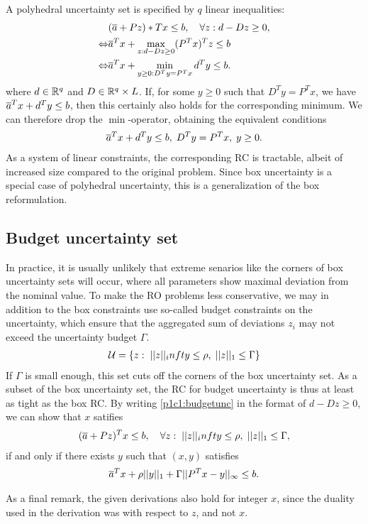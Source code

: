 A polyhedral uncertainty set is specified by $q$ linear inequalities:
\begin{align*}
& (\overline{ a }+Pz)*Tx\leq b, \quad\forall z: d-Dz\geq 0, \\
\Leftrightarrow & \overline{ a }^Tx + \max\limits_{z:d-Dz\geq 0} (P^Tx)^Tz\leq b \\
\Leftrightarrow & \overline{ a }^Tx + \min\limits_{y\geq 0:D^Ty=P^Tx} d^Ty \leq b.
\end{align*}
where $d\in\mathbb{R}^q$ and $D\in\mathbb{R}^q\times L$. If, for some $y\geq0$ such that $D^Ty = P^Tx$, we have $\overline{ a }^Tx+d^Ty\leq b$, then this certainly also holds for the corresponding minimum. We can therefore drop the $\min$-operator, obtaining the equivalent conditions  
\begin{align*}
 \overline{ a }^Tx + d^Ty \leq b,\;D^Ty=P^Tx,\;y\geq 0.
\end{align*}
As a system of linear constraints, the corresponding RC is tractable, albeit of increased size compared to the original problem. Since box uncertainty is a special case of polyhedral uncertainty, this is a generalization of the box reformulation.

\subsection{Budget uncertainty set}

In practice, it is usually unlikely that extreme senarios like the corners of box uncertainty sets will occur, where all parameters show maximal deviation from the nominal value. To make the RO problems less conservative, we may in addition to the box constraints use so-called budget constraints on the uncertainty, which ensure that the aggregated sum of deviations $z_i$ may not exceed the uncertainty budget $\Gamma$.
\begin{align}\label{p1c1:budgetunc}
\mathcal{U} = \{z:\;\vert\vert z \vert\vert_infty\leq\rho,\;\vert\vert z \vert\vert_1\leq\Gamma\}
\end{align}
If $\Gamma$ is small enough, this set cuts off the corners of the box uncertainty set. As a subset of the box uncertainty set, the RC for budget uncertainty is thus at least as tight as the box RC. By writing \eqref{p1c1:budgetunc} in the format of $d-Dz\geq 0$, we can show that $x$ satifies
\begin{align*}
(\overline{ a }+Pz)^Tx\leq b,\quad \forall z:\;\vert\vert z \vert\vert_infty\leq\rho,\;\vert\vert z \vert\vert_1\leq\Gamma,
\end{align*}
if and only if there exists $y$ such that $(x,y)$ satisfies
\begin{align*}
\overline{ a }^Tx+\rho\vert\vert y \vert\vert_1+\Gamma\vert\vert P^Tx-y \vert\vert_\infty\leq b.
\end{align*}

As a final remark, the given derivations also hold for integer $x$, since the duality used in the derivation was with respect to $z$, and not $x$.